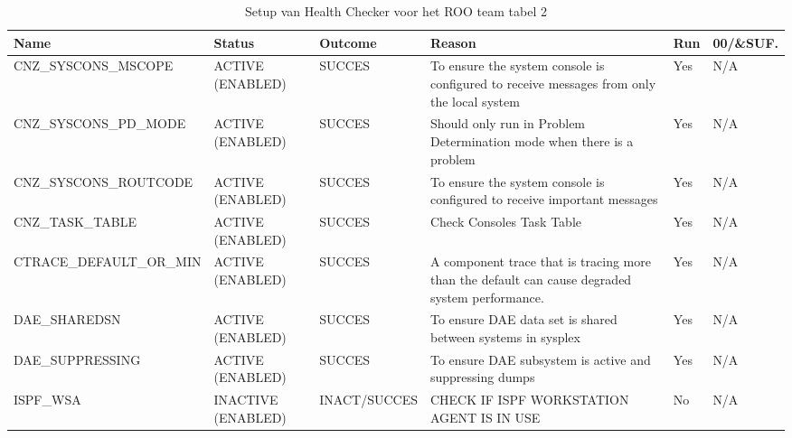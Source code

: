 \begin{landscape}
	\begin{table}[h]
		\begin{tabular}{|l|p{2.3cm}|l|p{4.5cm}|l|l|}
			\hline
			\textbf{Name}                       & \textbf{Status}   & \textbf{Outcome} & \textbf{Reason}                                                                                      & \textbf{Run} & \textbf{00/\&SUF.} \\ \hline
			CNZ\_SYSCONS\_MSCOPE     & ACTIVE (ENABLED)   & SUCCES       & To   ensure the system console is configured to receive messages from only the   local system         & Yes & N/A \\ \hline
			CNZ\_SYSCONS\_PD\_MODE   & ACTIVE (ENABLED)   & SUCCES       & Should   only run in Problem Determination mode when there is a problem                               & Yes & N/A \\ \hline
			CNZ\_SYSCONS\_ROUTCODE   & ACTIVE (ENABLED)   & SUCCES       & To   ensure the system console is configured to receive important messages                            & Yes & N/A \\ \hline
			CNZ\_TASK\_TABLE         & ACTIVE (ENABLED)   & SUCCES       & Check   Consoles Task Table                                                                           & Yes & N/A \\ \hline
			CTRACE\_DEFAULT\_OR\_MIN & ACTIVE (ENABLED)   & SUCCES       & A   component trace that is tracing more than the default can cause degraded    system   performance. & Yes & N/A \\ \hline
			DAE\_SHAREDSN            & ACTIVE (ENABLED)   & SUCCES       & To   ensure DAE data set is shared between systems in sysplex                                         & Yes & N/A \\ \hline
			DAE\_SUPPRESSING         & ACTIVE (ENABLED)   & SUCCES       & To   ensure DAE subsystem is active and suppressing dumps                                             & Yes & N/A \\ \hline
			ISPF\_WSA                & INACTIVE (ENABLED) & INACT/SUCCES & CHECK   IF ISPF WORKSTATION AGENT IS IN USE                                                           & No  & N/A \\ \hline	
		\end{tabular}
		\caption[Health Checker ROO team tabel 2]{Setup van Health Checker voor het ROO team tabel 2}
		\label{tbl:ROO Team Tabel 2}
	\end{table}
\end{landscape}

